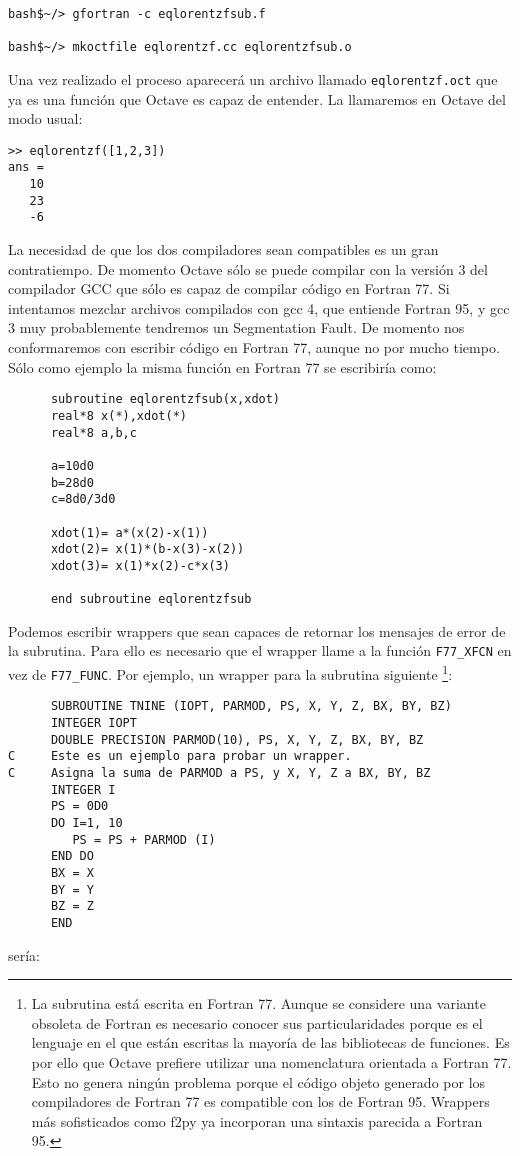   \begin{verbatim}
bash$~/> gfortran -c eqlorentzfsub.f

bash$~/> mkoctfile eqlorentzf.cc eqlorentzfsub.o
\end{verbatim}
Una vez realizado el proceso aparecerá un archivo llamado
\texttt{eqlorentzf.oct} que ya es una función que Octave es capaz de
entender. La llamaremos en Octave del modo usual:

\begin{verbatim}
>> eqlorentzf([1,2,3])
ans =
   10
   23
   -6
\end{verbatim}
La necesidad de que los dos compiladores sean compatibles es un gran
contratiempo. De momento Octave sólo se puede compilar con la versión
3 del compilador GCC que sólo es capaz de compilar código en Fortran
77. Si intentamos mezclar archivos compilados con gcc 4, que entiende
Fortran 95, y gcc 3 muy probablemente tendremos un Segmentation Fault.
De momento nos conformaremos con escribir código en Fortran 77, aunque
no por mucho tiempo. Sólo como ejemplo la misma función en Fortran 77
se escribiría como:

\begin{verbatim}
      subroutine eqlorentzfsub(x,xdot)
      real*8 x(*),xdot(*)
      real*8 a,b,c

      a=10d0
      b=28d0
      c=8d0/3d0

      xdot(1)= a*(x(2)-x(1))
      xdot(2)= x(1)*(b-x(3)-x(2))
      xdot(3)= x(1)*x(2)-c*x(3)

      end subroutine eqlorentzfsub
\end{verbatim}
Podemos escribir wrappers que sean capaces de retornar los mensajes de
error de la subrutina. Para ello es necesario que el wrapper llame a
la función \texttt{F77\_XFCN} en vez de \texttt{F77\_FUNC}. Por
ejemplo, un wrapper para la subrutina siguiente%
\footnote{La subrutina está escrita en Fortran 77. Aunque se considere
  una variante obsoleta de Fortran es necesario conocer sus
  particularidades porque es el lenguaje en el que están escritas la
  mayoría de las bibliotecas de funciones. Es por ello que Octave
  prefiere utilizar una nomenclatura orientada a Fortran 77. Esto no
  genera ningún problema porque el código objeto generado por los
  compiladores de Fortran 77 es compatible con los de Fortran 95.
  Wrappers más sofisticados como f2py ya incorporan una sintaxis
  parecida a Fortran 95.%
}:
\begin{verbatim}
      SUBROUTINE TNINE (IOPT, PARMOD, PS, X, Y, Z, BX, BY, BZ)
      INTEGER IOPT
      DOUBLE PRECISION PARMOD(10), PS, X, Y, Z, BX, BY, BZ    
C     Este es un ejemplo para probar un wrapper.
C     Asigna la suma de PARMOD a PS, y X, Y, Z a BX, BY, BZ
      INTEGER I
      PS = 0D0
      DO I=1, 10
         PS = PS + PARMOD (I)
      END DO
      BX = X
      BY = Y
      BZ = Z
      END
\end{verbatim}
sería:

